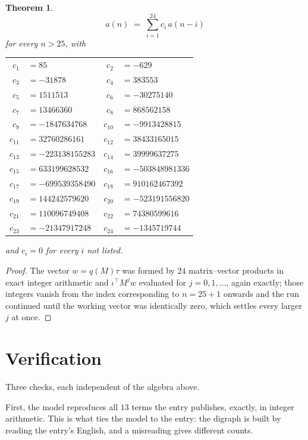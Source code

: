 \documentclass[11pt,a4paper]{article}
\theoremstyle{plain}
\newtheorem{theorem}{Theorem}
\theoremstyle{definition}
\begin{document}
\begin{theorem}
\[
a(n)\;=\;\sum_{i=1}^{24}c_i\,a(n-i)
\]
for every $n>25$, with
\begin{center}\footnotesize
\begin{tabular}{r@{\,}l@{\qquad}r@{\,}l}
$c_{1}$ & $=85$ & $c_{2}$ & $=-629$ \\
$c_{3}$ & $=-31878$ & $c_{4}$ & $=383553$ \\
$c_{5}$ & $=1511513$ & $c_{6}$ & $=-30275140$ \\
$c_{7}$ & $=13466360$ & $c_{8}$ & $=868562158$ \\
$c_{9}$ & $=-1847634768$ & $c_{10}$ & $=-9913428815$ \\
$c_{11}$ & $=32760286161$ & $c_{12}$ & $=38433165015$ \\
$c_{13}$ & $=-223138155283$ & $c_{14}$ & $=39999637275$ \\
$c_{15}$ & $=633199628532$ & $c_{16}$ & $=-503848981336$ \\
$c_{17}$ & $=-699539358490$ & $c_{18}$ & $=910162467392$ \\
$c_{19}$ & $=144242579620$ & $c_{20}$ & $=-523191556820$ \\
$c_{21}$ & $=110096749408$ & $c_{22}$ & $=74380599616$ \\
$c_{23}$ & $=-21347917248$ & $c_{24}$ & $=-1345719744$ \\
\end{tabular}
\end{center}
and $c_i=0$ for every $i$ not listed.
\end{theorem}

\begin{proof}
The vector $w=q(M)\tau$ was formed by $24$ matrix--vector products in exact integer
arithmetic and $\iota^{\!\top}M^{j}w$ evaluated for $j=0,1,\dots$, again exactly; those
integers vanish from the index corresponding to $n=25+1$ onwards and the run continued
until the working vector was identically zero, which settles every larger $j$ at once.
\end{proof}

\section{Verification}

Three checks, each independent of the algebra above.

First, the model reproduces all $13$ terms the entry publishes, exactly, in integer
arithmetic. This is what ties the model to the entry: the digraph is built by reading the
entry's English, and a misreading gives different counts.
\end{document}
